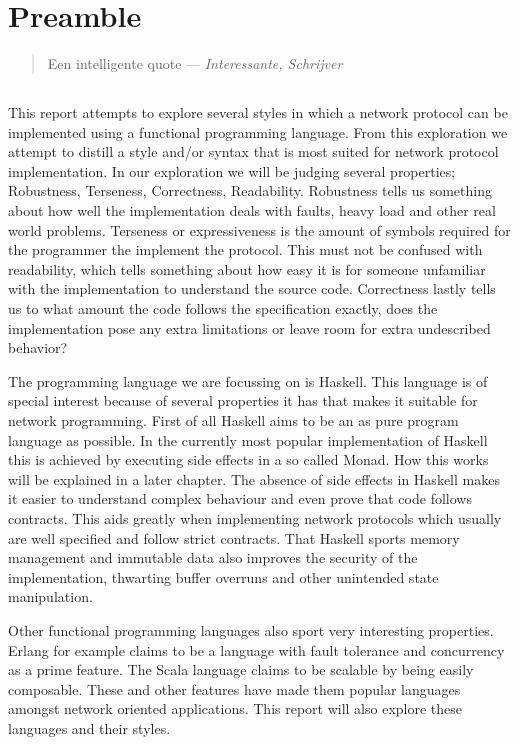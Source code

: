 \chapter*{Preamble}
\begin{quote}
Een intelligente quote
--- \emph{Interessante, Schrijver}
\end{quote}

\section{}
This report attempts to explore several styles in which a network protocol can be implemented using a functional programming language. From this exploration we attempt to distill a style and/or syntax that is most suited for network protocol implementation. In our exploration we will be judging several properties; Robustness, Terseness, Correctness, Readability. Robustness tells us something about how well the implementation deals with faults, heavy load and other real world problems. Terseness or expressiveness is the amount of symbols required for the programmer the implement the protocol. This must not be confused with readability, which tells something about how easy it is for someone unfamiliar with the implementation to understand the source code. Correctness lastly tells us to what amount the code follows the specification exactly, does the implementation pose any extra limitations or leave room for extra undescribed behavior?

The programming language we are focussing on is Haskell. This language is of special interest because of several properties it has that makes it suitable for network programming. First of all Haskell aims to be an as pure program language as possible. In the currently most popular implementation of Haskell this is achieved by executing side effects in a so called Monad. How this works will be explained in a later chapter. The absence of side effects in Haskell makes it easier to understand complex behaviour and even prove that code follows contracts. This aids greatly when implementing network protocols which usually are well specified and follow strict contracts. That Haskell sports memory management and immutable data also improves the security of the implementation, thwarting buffer overruns and other unintended state manipulation.

Other functional programming languages also sport very interesting properties. Erlang for example claims to be a language with fault tolerance and concurrency as a prime feature. The Scala language claims to be scalable by being easily composable. These and other features have made them popular languages amongst network oriented applications. This report will also explore these languages and their styles.
